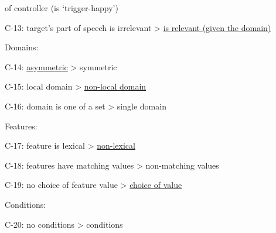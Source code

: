 \documentclass[a4paper, 12pt, article]{memoir}
\begin{document}
\begin{appendices}
\begin{raggedright}
\begin{compactitem}
\begin{compactitem}
{					of controller (is `trigger-happy')}
				\item C-13: target's part of speech is irrelevant > \uline{is relevant
					(given the domain)}
			\end{compactitem}
			\item Domains:
			\begin{compactitem}
				\item C-14: \uline{asymmetric} > symmetric
				\item C-15: local domain > \uline{non-local domain}
				\item C-16: domain is one of a set > single domain
			\end{compactitem}
			\item Features:
			\begin{compactitem}
				\item C-17: feature is lexical > \uline{non-lexical}
				\item C-18: features have matching values > non-matching values
				\item C-19: no choice of feature value > \uline{choice of value}
			\end{compactitem}
			\item Conditions:
			\begin{compactitem}
				\item C-20: no conditions > conditions
			\end{compactitem}
		\end{compactitem}
	\end{raggedright}
\end{appendices}
\end{document}
